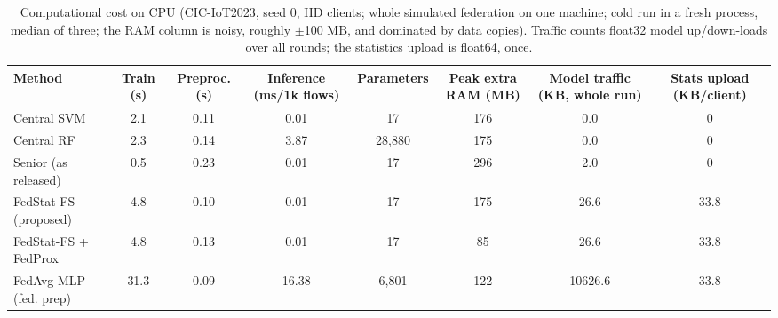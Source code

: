 \begin{table}[t]
\centering
\caption{Computational cost on CPU (CIC-IoT2023, seed 0, IID clients; whole simulated federation on one machine; cold run in a fresh process, median of three; the RAM column is noisy, roughly $\pm$100 MB, and dominated by data copies). Traffic counts float32 model up/down-loads over all rounds; the statistics upload is float64, once.}
\label{tab:cost}
\tiny
\setlength{\tabcolsep}{2.4pt}
\begin{tabular}{lccccccc}
\toprule
Method & Train (s) & Preproc. (s) & Inference (ms/1k flows) & Parameters & Peak extra RAM (MB) & Model traffic (KB, whole run) & Stats upload (KB/client) \\
\midrule
Central SVM & 2.1 & 0.11 & 0.01 & 17 & 176 & 0.0 & 0 \\
Central RF & 2.3 & 0.14 & 3.87 & 28,880 & 175 & 0.0 & 0 \\
Senior (as released) & 0.5 & 0.23 & 0.01 & 17 & 296 & 2.0 & 0 \\
FedStat-FS (proposed) & 4.8 & 0.10 & 0.01 & 17 & 175 & 26.6 & 33.8 \\
FedStat-FS + FedProx & 4.8 & 0.13 & 0.01 & 17 & 85 & 26.6 & 33.8 \\
FedAvg-MLP (fed. prep) & 31.3 & 0.09 & 16.38 & 6,801 & 122 & 10626.6 & 33.8 \\
\bottomrule
\end{tabular}
\end{table}